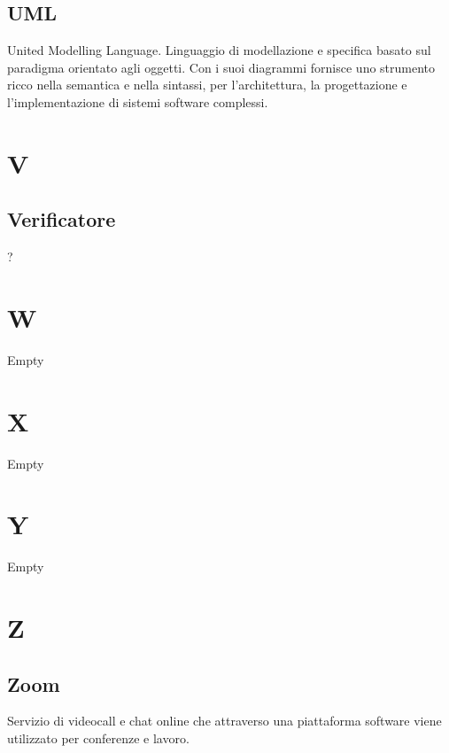 \subsection*{UML}
United Modelling Language. Linguaggio di modellazione e specifica basato sul paradigma orientato agli oggetti. Con i suoi diagrammi fornisce uno strumento  ricco nella semantica e nella sintassi, per l'architettura, la progettazione e l'implementazione di sistemi software complessi.

\section*{V}
\subsection*{Verificatore}
?
\section*{W}
Empty

\section*{X}
Empty

\section*{Y}
Empty

\section*{Z}
\subsection*{Zoom}
Servizio di videocall e chat online che attraverso una piattaforma software viene utilizzato per conferenze e lavoro.
